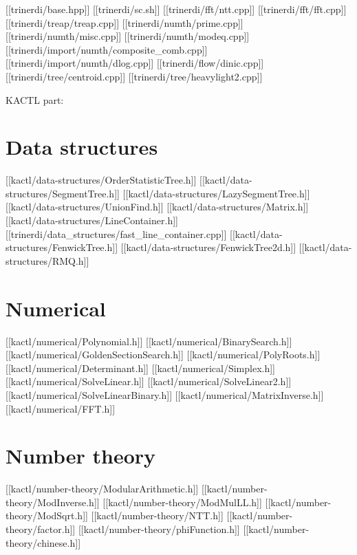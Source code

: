 



[[trinerdi/base.hpp]]
[[trinerdi/sc.sh]]
[[trinerdi/fft/ntt.cpp]]
[[trinerdi/fft/fft.cpp]]
[[trinerdi/treap/treap.cpp]]
[[trinerdi/numth/prime.cpp]]
[[trinerdi/numth/misc.cpp]]
[[trinerdi/numth/modeq.cpp]]
[[trinerdi/import/numth/composite_comb.cpp]]
[[trinerdi/import/numth/dlog.cpp]]
[[trinerdi/flow/dinic.cpp]]
[[trinerdi/tree/centroid.cpp]]
[[trinerdi/tree/heavylight2.cpp]]

KACTL part:

%


\chapter{Data structures}

[[kactl/data-structures/OrderStatisticTree.h]]
[[kactl/data-structures/SegmentTree.h]]
[[kactl/data-structures/LazySegmentTree.h]]
[[kactl/data-structures/UnionFind.h]]
[[kactl/data-structures/Matrix.h]]
[[kactl/data-structures/LineContainer.h]]
[[trinerdi/data_structures/fast_line_container.cpp]]
[[kactl/data-structures/FenwickTree.h]]
[[kactl/data-structures/FenwickTree2d.h]]
[[kactl/data-structures/RMQ.h]]

\chapter{Numerical}

[[kactl/numerical/Polynomial.h]]
[[kactl/numerical/BinarySearch.h]]
[[kactl/numerical/GoldenSectionSearch.h]]
[[kactl/numerical/PolyRoots.h]]
[[kactl/numerical/Determinant.h]]
[[kactl/numerical/Simplex.h]]
[[kactl/numerical/SolveLinear.h]]
[[kactl/numerical/SolveLinear2.h]]
[[kactl/numerical/SolveLinearBinary.h]]
[[kactl/numerical/MatrixInverse.h]]
[[kactl/numerical/FFT.h]]

\chapter{Number theory}

[[kactl/number-theory/ModularArithmetic.h]]
[[kactl/number-theory/ModInverse.h]]
[[kactl/number-theory/ModMulLL.h]]
[[kactl/number-theory/ModSqrt.h]]
[[kactl/number-theory/NTT.h]]
[[kactl/number-theory/factor.h]]
[[kactl/number-theory/phiFunction.h]]
[[kactl/number-theory/chinese.h]]

